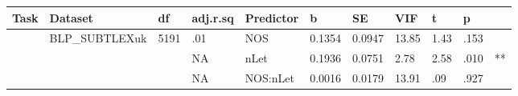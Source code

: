 \begin{table}[ht]
\centering
\begingroup\normalsize
\begin{tabular}{lllllllllll}
  \hline
Task & Dataset & df & adj.r.sq & Predictor & b & SE & VIF & t & p &  \\ 
  \hline
 & BLP\_SUBTLEXuk & 5191 & .01 & NOS & 0.1354 & 0.0947 & 13.85 & 1.43 & .153 &   \\ 
   &  &  & NA & nLet & 0.1936 & 0.0751 & 2.78 & 2.58 & .010 & ** \\ 
   &  &  & NA & NOS:nLet & 0.0016 & 0.0179 & 13.91 & .09 & .927 &   \\ 
   \hline
\end{tabular}
\endgroup
\end{table}
